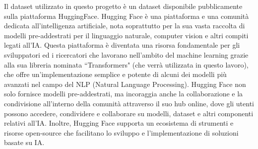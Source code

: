 \documentclass[../../Thesis.tex]{subfiles}
\begin{document}
Il dataset \cite{rossini2022slitherauditedcontracts} utilizzato in questo progetto \`e un dataset disponibile pubblicamente sulla piattaforma HuggingFace. Hugging Face \`e una piattaforma e una comunit\`a dedicata all'intelligenza artificiale, nota soprattutto per la sua vasta raccolta di modelli pre-addestrati per il linguaggio naturale, computer vision e altri compiti legati all'IA. Questa piattaforma \`e diventata una risorsa fondamentale per gli sviluppatori ed i ricercatori che lavorano nell'ambito del machine learning grazie alla sua libreria nominata ``Transformers" (che verr\`a utilizzata in questo lavoro), che offre un'implementazione semplice e potente di alcuni dei modelli pi\`u avanzati nel campo del NLP (Natural Language Processing). Hugging Face non solo fornisce modelli pre-addestrati, ma incoraggia anche la collaborazione e la condivisione all'interno della comunit\`a attraverso il suo hub online, dove gli utenti possono accedere, condividere e collaborare su modelli, dataset e altri componenti relativi all'IA. Inoltre, Hugging Face supporta un ecosistema di strumenti e risorse open-source che facilitano lo sviluppo e l'implementazione di soluzioni basate su IA.
\end{document}
